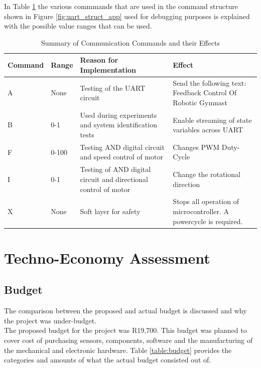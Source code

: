 In Table \ref{table:uart_commands} the various commmands that are used in the command structure shown in Figure \ref{fig:uart_struct_app} used for debugging purposes is explained with the possible value ranges that can be used.


\begin{table}[h]
	\centering
	\begin{tabular}{|p{2cm}|p{1cm}|p{5cm}|p{5cm}|}
		\hline
		Command & Range &  Reason for Implementation & Effect \\
		\hline
		\hline
		A & None & Testing of the UART circuit & Send the following text: Feedback Control Of Robotic Gymnast\\
		\hline
		B & 0-1 & Used during experiments and system identification tests& Enable streaming of state variables across UART \\ 
		\hline
		F & 0-100 &  Testing AND digital circuit and speed control of motor& Changes PWM Duty-Cycle \\
		\hline
		I & 0-1 & Testing of AND digital circuit and directional control of motor & Change the rotational direction \\
		\hline
		X & None & Soft layer for safety & Stops all operation of microcontroller. A powercycle is required.   \\
		\hline
	
	\end{tabular}
	\caption{Summary of Communication Commands and their Effects}
	\label{table:uart_commands}

\end{table}


\newpage


%





\section{Techno-Economy Assessment}
\label{sec:techno_eco}

\subsection{Budget}
The comparison between the proposed and actual budget is discussed and why the project was under-budget.\\

The proposed budget for the project was R19,700. This budget was planned to cover cost of purchasing sensors, components, software and the manufacturing of the mechanical and electronic hardware. Table \ref{table:budget} provides the categories and amounts of what the actual budget consisted out of.\\

